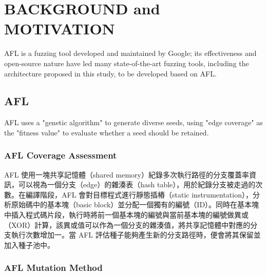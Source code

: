 \section{BACKGROUND and MOTIVATION}
\label{ch:motivation}

AFL is a fuzzing tool developed and maintained by Google; %
its effectiveness and open-source nature have led many state-of-the-art fuzzing tools, including the architecture proposed in this study, to be developed based on AFL.

\subsection{AFL}


AFL uses a "genetic algorithm" to generate diverse seeds, using "edge coverage" as the "fitness value" to evaluate whether a seed should be retained. 

\iffalse
\subsubsection{AFL Coverage Assessment} %

AFL 使用一塊共享記憶體（shared memory）紀錄多次執行路徑的分支覆蓋率資訊，可以視為一個分支（edge）的雜湊表（hash table），用於紀錄分支被走過的次數。在編譯階段，AFL 會對目標程式進行靜態插樁（static instrumentation），分析原始碼中的基本塊（basic block）並分配一個獨有的編號（ID）。同時在基本塊中插入程式碼片段，執行時將前一個基本塊的編號與當前基本塊的編號做異或（XOR）計算，該異或值可以作為一個分支的雜湊值，將共享記憶體中對應的分支執行次數增加一。當 AFL 評估種子能夠產生新的分支路徑時，便會將其保留並加入種子池中。

\subsubsection{AFL Mutation Method} %

